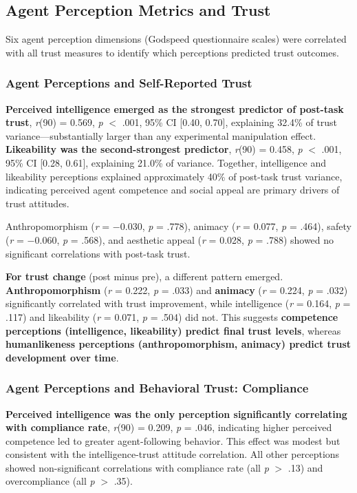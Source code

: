 \documentclass[12pt]{article}
\begin{document}
\subsection{Agent Perception Metrics and Trust}

Six agent perception dimensions (Godspeed questionnaire scales) were correlated with all trust measures to identify which perceptions predicted trust outcomes.

\subsubsection{Agent Perceptions and Self-Reported Trust}

\textbf{Perceived intelligence emerged as the strongest predictor of post-task trust}, \textit{r}(90) = 0.569, \textit{p} $<$ .001, 95\% CI [0.40, 0.70], explaining 32.4\% of trust variance---substantially larger than any experimental manipulation effect. \textbf{Likeability was the second-strongest predictor}, \textit{r}(90) = 0.458, \textit{p} $<$ .001, 95\% CI [0.28, 0.61], explaining 21.0\% of variance. Together, intelligence and likeability perceptions explained approximately 40\% of post-task trust variance, indicating perceived agent competence and social appeal are primary drivers of trust attitudes.

Anthropomorphism (\textit{r} = $-$0.030, \textit{p} = .778), animacy (\textit{r} = 0.077, \textit{p} = .464), safety (\textit{r} = $-$0.060, \textit{p} = .568), and aesthetic appeal (\textit{r} = 0.028, \textit{p} = .788) showed no significant correlations with post-task trust.

\textbf{For trust change} (post minus pre), a different pattern emerged. \textbf{Anthropomorphism} (\textit{r} = 0.222, \textit{p} = .033) and \textbf{animacy} (\textit{r} = 0.224, \textit{p} = .032) significantly correlated with trust improvement, while intelligence (\textit{r} = 0.164, \textit{p} = .117) and likeability (\textit{r} = 0.071, \textit{p} = .504) did not. This suggests \textbf{competence perceptions (intelligence, likeability) predict final trust levels}, whereas \textbf{humanlikeness perceptions (anthropomorphism, animacy) predict trust development over time}.

\subsubsection{Agent Perceptions and Behavioral Trust: Compliance}

\textbf{Perceived intelligence was the only perception significantly correlating with compliance rate}, \textit{r}(90) = 0.209, \textit{p} = .046, indicating higher perceived competence led to greater agent-following behavior. This effect was modest but consistent with the intelligence-trust attitude correlation. All other perceptions showed non-significant correlations with compliance rate (all \textit{p} $>$ .13) and overcompliance (all \textit{p} $>$ .35).
\end{document}
